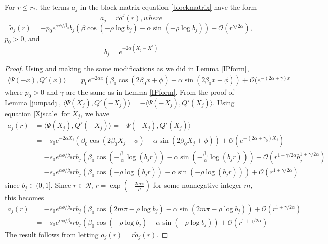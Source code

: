\documentclass[thesis.tex]{subfiles}
\begin{document}
\begin{lemma}\label{lemma:ajparam}
For $r \leq r_*$, the terms $a_j$ in the block matrix equation \cref{blockmatrix} have the form
\[
a_j = r \tilde{a}^j(r), where
\]
\begin{equation}\label{ajparam}
\tilde{a}_j(r) = -p_0 e^{\alpha \phi/\beta_0} b_j \left( \beta \cos\left(-\rho \log b_j \right) - \alpha \sin \left(-\rho \log b_j \right) \right) + \mathcal{O}(r^{\gamma/2\alpha}),
\end{equation}
$p_0 > 0$, and
\begin{equation}\label{bj2}
b_j = e^{-2 \alpha (X_j - X^*)}
\end{equation}

\begin{proof}
Using \cite[Lemma 6.1]{Sandstede1998} and making the same modifications as we did in Lemma \ref{IPform},
\begin{align*}\label{IPpsiQprime}
\langle \Psi(-x), Q'(x) \rangle
&= p_0 e^{-2 \alpha x}\left( \beta_0 \cos(2 \beta_0 x + \phi) - \alpha \sin(2 \beta_0 x + \phi)\right) + \mathcal{O}(e^{-(2 \alpha + \gamma) x}
\end{align*}
where $p_0 > 0$ and $\gamma$ are the same as in Lemma \ref{IPform}. From the proof of Lemma \ref{jumpadj}, $\langle \Psi(X_j), Q'(-X_j) \rangle = - \langle \Psi(-X_j), Q'(X_j) \rangle$. Using equation \cref{Xjscale} for $X_j$, we have
\begin{align*}
a_j(r) &= \langle \Psi(X_j), Q'(-X_j) \rangle = -\Psi(-X_j), Q'(X_j) \rangle \\
&= -s_0 e^{-2 \alpha X_j}\left( \beta_0 \cos(2 \beta_0 X_j + \phi) - \alpha \sin(2 \beta_0 X_j + \phi)\right) + \mathcal{O}(e^{-(2 \alpha + \gamma_0) X_j}) \\
&= -s_0 e^{\alpha \phi/\beta_0} r b_j \left( \beta_0 \cos\left( -\frac{\beta_0}{\alpha} \log(b_j r) \right) - \alpha \sin \left( -\frac{\beta_0}{\alpha} \log(b_j r) \right) \right) + \mathcal{O}(r^{1+\gamma/2\alpha} b_j^{1 + \gamma/2\alpha}) \\
&= -s_0 e^{\alpha \phi/\beta_0} r b_j \left( \beta_0 \cos\left( -\rho \log(b_j r) \right) - \alpha \sin \left( -\rho \log(b_j r) \right) \right) + \mathcal{O}(r^{1+\gamma/2\alpha})
\end{align*}
since $b_j \in (0, 1]$. Since $r \in \mathcal{R}$, $r = \exp\left(-\frac{2 m \pi}{\rho}\right)$ for some nonnegative integer $m$, this becomes 
\begin{align*}
a_j(r) &= -s_0 e^{\alpha \phi/\beta_0} r b_j \left( \beta_0 \cos\left( 2 m \pi -\rho \log b_j \right) - \alpha \sin \left( 2 m \pi -\rho \log b_j \right) \right) + \mathcal{O}(r^{1+\gamma/2\alpha}) \\
&= -s_0 e^{\alpha \phi/\beta_0} r b_j \left( \beta_0 \cos\left(-\rho \log b_j \right) - \alpha \sin \left(-\rho \log b_j \right) \right) + \mathcal{O}(r^{1+\gamma/2\alpha})
\end{align*}
The result follows from letting $a_j(r) = r \tilde{a}_j(r)$.
\end{proof}
\end{lemma}
\end{document}

